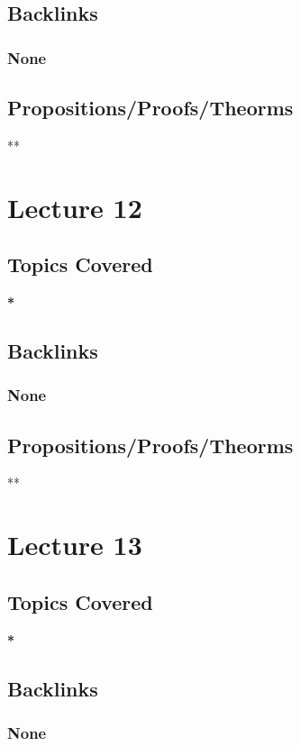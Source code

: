 \documentclass[11pt]{article}
\begin{document}
\subsection*{Backlinks}
\label{sec:org3beb9c4}
\subsubsection*{None}
\label{sec:orgfa2dbf7}
\subsection*{Propositions/Proofs/Theorms}
\label{sec:org52d36af}
**

\section*{Lecture 12}
\label{sec:org54015e3}
\subsection*{Topics Covered}
\label{sec:org64fa800}
\textbf{*}
\subsection*{Backlinks}
\label{sec:org23131dc}
\subsubsection*{None}
\label{sec:orga20006b}
\subsection*{Propositions/Proofs/Theorms}
\label{sec:orgd3798ef}
**

\section*{Lecture 13}
\label{sec:org9f61758}
\subsection*{Topics Covered}
\label{sec:orgfb5de79}
\textbf{*}
\subsection*{Backlinks}
\label{sec:org56dcc56}
\subsubsection*{None}
\label{sec:org36beedf}
\end{document}
